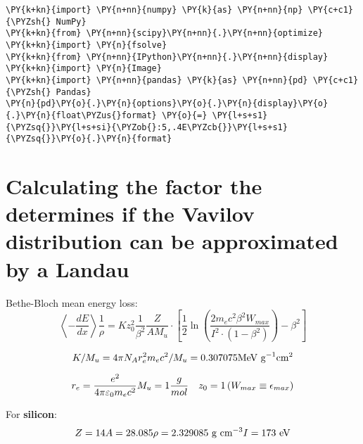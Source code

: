     
    
\begin{tcolorbox}[breakable, size=fbox, boxrule=1pt, pad at break*=1mm,colback=cellbackground, colframe=cellborder]
\begin{Verbatim}[commandchars=\\\{\}]
\PY{k+kn}{import} \PY{n+nn}{numpy} \PY{k}{as} \PY{n+nn}{np} \PY{c+c1}{\PYZsh{} NumPy}
\PY{k+kn}{from} \PY{n+nn}{scipy}\PY{n+nn}{.}\PY{n+nn}{optimize} \PY{k+kn}{import} \PY{n}{fsolve} 
\PY{k+kn}{from} \PY{n+nn}{IPython}\PY{n+nn}{.}\PY{n+nn}{display} \PY{k+kn}{import} \PY{n}{Image}
\PY{k+kn}{import} \PY{n+nn}{pandas} \PY{k}{as} \PY{n+nn}{pd} \PY{c+c1}{\PYZsh{} Pandas}
\PY{n}{pd}\PY{o}{.}\PY{n}{options}\PY{o}{.}\PY{n}{display}\PY{o}{.}\PY{n}{float\PYZus{}format} \PY{o}{=} \PY{l+s+s1}{\PYZsq{}}\PY{l+s+si}{\PYZob{}:5,.4E\PYZcb{}}\PY{l+s+s1}{\PYZsq{}}\PY{o}{.}\PY{n}{format}
\end{Verbatim}
\end{tcolorbox}

    \hypertarget{calculating-the-factor-the-determines-if-the-vavilov-distribution-can-be-approximated-by-a-landau}{%
\section{Calculating the factor the determines if the Vavilov
distribution can be approximated by a
Landau}\label{calculating-the-factor-the-determines-if-the-vavilov-distribution-can-be-approximated-by-a-landau}}

Bethe-Bloch mean energy loss: \[
\left\langle-\frac{dE}{dx} \right\rangle \frac{1}{\rho} =  K z_0^2 \frac{1}{\beta^2} \frac{Z}{A M_u} \cdot\left[\frac{1}{2}\ln \left(\frac{2m_e c^2 \beta^2 W_{max}}{I^2 \cdot (1-\beta^2)}\right) - \beta^2\right]
\]

\[
K/M_u = 4 \pi N_A r_e^2 m_e c^2 /M_u = 0.307075\space \text{MeV g}^{-1} \text{cm}^2
\]

\[
r_e  = \frac{e^2}{4\pi\varepsilon_0 m_e c^2} \\
M_u = 1 \frac{g}{mol} \quad z_0=1 \\
\left( W_{max} \equiv \epsilon_{max} \right)
\]

For \textbf{silicon}: \[
Z = 14 \\
A = 28.085 \\ 
\rho = 2.329085 \text{  g cm}^{-3}\\
I = 173 \text{ eV} %
\]

